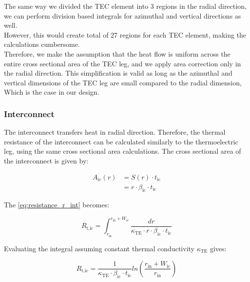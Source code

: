 \documentclass[10pt,a4paper,twocolumn]{article}
\newenvironment{customnote}[1][]{
    \begin{tcolorbox}[NoteBox, #1]
}{
    \end{tcolorbox}
}
\begin{document}
\begin{customnote}
	The same way we divided the TEC element into 3 regions in the radial direction, we can perform division based integrals for azimuthal and vertical directions as well.\\
	
	However, this would create total of 27 regions for each TEC element, making the calculations cumbersome.\\
	
	Therefore, we make the assumption that the heat flow is uniform across the entire cross sectional area of the TEC leg, and we apply area correction only in the radial direction. This simplification is valid as long as the azimuthal and vertical dimensions of the TEC leg are small compared to the radial dimension, Which is the case in our design.\\
\end{customnote}

\subsubsection{Interconnect}

The interconnect transfers heat in radial direction. Therefore, the thermal resistance of the interconnect can be calculated similarly to the thermoelectric leg, using the same cross sectional area calculations. The cross sectional area of the interconnect is given by:

\begin{equation*}
	\begin{aligned}
		A_{\text{ic}}(r) & = S(r)\cdot t_{\text{ic}}                       \\
		                 & = r \cdot \beta_{\text{ic}} \cdot t_{\text{ic}}
	\end{aligned}
\end{equation*}

The \cref{eq:resistance_r_int} becomes:

\begin{equation*}
	R_{\text{t,ic}} = \int_{r_{\text{in}}}^{r_{\text{in}}+W_{\text{ic}}} \frac{dr}{\kappa_{\text{TE}} \cdot r \cdot \beta_{\text{ic}} \cdot t_{\text{ic}}}
\end{equation*}

Evaluating the integral assuming constant thermal conductivity $\kappa_{\text{TE}}$ gives:

\begin{equation}
	R_{\text{t,ic}} = \frac{1}{\kappa_{\text{TE}} \cdot \beta_{\text{ic}} \cdot t_{\text{ic}}} ln\left( \frac{r_{\text{in}} + W_{\text{ic}}}{r_{\text{in}}} \right)
\end{equation}
\end{document}
